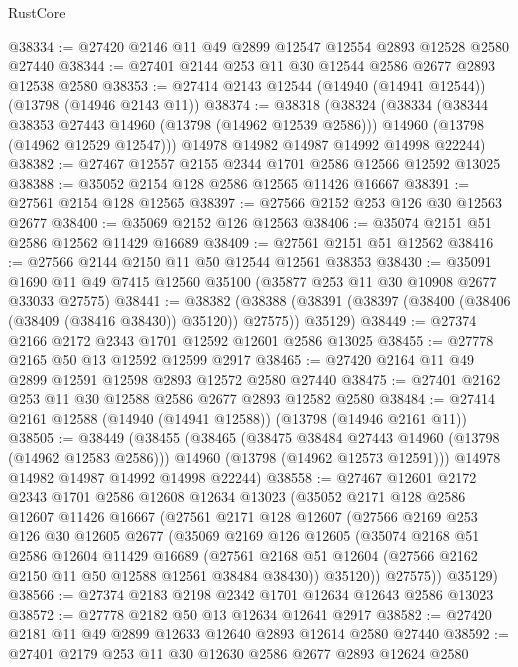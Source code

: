 \begin{lexlean}{RustCore}
\begin{coremodule}
@38334 := @27420 @2146 @11 @49 @2899 @12547 @12554 @2893 @12528 @2580 @27440
@38344 := @27401 @2144 @253 @11 @30 @12544 @2586 @2677 @2893 @12538 @2580
@38353 := @27414 @2143 @12544 (@14940 (@14941 @12544)) (@13798 (@14946 @2143 @11))
@38374 := @38318
    (@38324
      (@38334
        (@38344 @38353 @27443 @14960 (@13798 (@14962 @12539 @2586)))
        @14960
        (@13798 (@14962 @12529 @12547)))
      @14978
      @14982
      @14987
      @14992
      @14998
      @22244)
@38382 := @27467 @12557 @2155 @2344 @1701 @2586 @12566 @12592 @13025
@38388 := @35052 @2154 @128 @2586 @12565 @11426 @16667
@38391 := @27561 @2154 @128 @12565
@38397 := @27566 @2152 @253 @126 @30 @12563 @2677
@38400 := @35069 @2152 @126 @12563
@38406 := @35074 @2151 @51 @2586 @12562 @11429 @16689
@38409 := @27561 @2151 @51 @12562
@38416 := @27566 @2144 @2150 @11 @50 @12544 @12561 @38353
@38430 := @35091 @1690 @11 @49 @7415 @12560 @35100 (@35877 @253 @11 @30 @10908 @2677 @33033 @27575)
@38441 := @38382
    (@38388 (@38391 (@38397 (@38400 (@38406 (@38409 (@38416 @38430)) @35120)) @27575)) @35129)
@38449 := @27374 @2166 @2172 @2343 @1701 @12592 @12601 @2586 @13025
@38455 := @27778 @2165 @50 @13 @12592 @12599 @2917
@38465 := @27420 @2164 @11 @49 @2899 @12591 @12598 @2893 @12572 @2580 @27440
@38475 := @27401 @2162 @253 @11 @30 @12588 @2586 @2677 @2893 @12582 @2580
@38484 := @27414 @2161 @12588 (@14940 (@14941 @12588)) (@13798 (@14946 @2161 @11))
@38505 := @38449
    (@38455
      (@38465
        (@38475 @38484 @27443 @14960 (@13798 (@14962 @12583 @2586)))
        @14960
        (@13798 (@14962 @12573 @12591)))
      @14978
      @14982
      @14987
      @14992
      @14998
      @22244)
@38558 := @27467
    @12601
    @2172
    @2343
    @1701
    @2586
    @12608
    @12634
    @13023
    (@35052
      @2171
      @128
      @2586
      @12607
      @11426
      @16667
      (@27561
        @2171
        @128
        @12607
        (@27566
          @2169
          @253
          @126
          @30
          @12605
          @2677
          (@35069
            @2169
            @126
            @12605
            (@35074
              @2168
              @51
              @2586
              @12604
              @11429
              @16689
              (@27561 @2168 @51 @12604 (@27566 @2162 @2150 @11 @50 @12588 @12561 @38484 @38430))
              @35120))
          @27575))
      @35129)
@38566 := @27374 @2183 @2198 @2342 @1701 @12634 @12643 @2586 @13023
@38572 := @27778 @2182 @50 @13 @12634 @12641 @2917
@38582 := @27420 @2181 @11 @49 @2899 @12633 @12640 @2893 @12614 @2580 @27440
@38592 := @27401 @2179 @253 @11 @30 @12630 @2586 @2677 @2893 @12624 @2580

\end{coremodule}
\end{lexlean}
